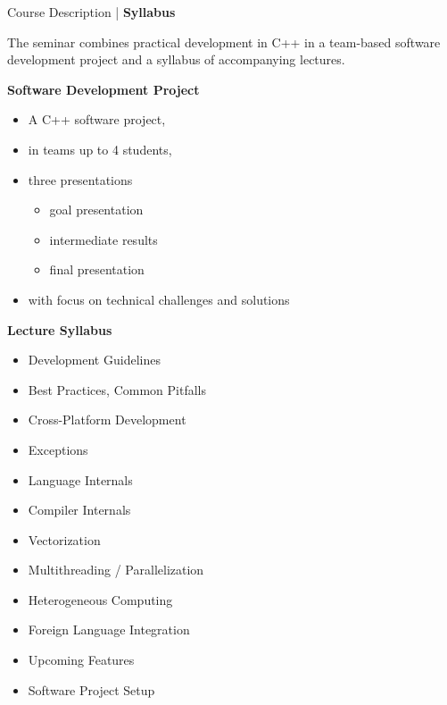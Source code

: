 \begin{frame}{Course Description | \textbf{Syllabus}}
    
    {
    	The seminar combines practical development in C++ in a team-based software development project and a syllabus of accompanying lectures.
    	
    	\bigskip
    	\bigskip
    	
    	\textbf{Software Development Project}
    	
    	\begin{itemize}
    		\item A C++ software project,
    		\item in teams up to 4 students,
    		\item three presentations
	    		\begin{itemize}
	    			\item goal presentation
			    	\item intermediate results
			    	\item final presentation
	    		\end{itemize}
    		\item with focus on technical challenges and solutions
    	\end{itemize}
    }
    {
    	\textbf{Lecture Syllabus}
    	
        \begin{itemize}
            \item Development Guidelines
            \item Best Practices, Common Pitfalls
            \item Cross-Platform Development
            \item Exceptions
            \item Language Internals
            \item Compiler Internals
            \item Vectorization
            \item Multithreading / Parallelization
            \item Heterogeneous Computing
	        \item Foreign Language Integration
	        \item Upcoming Features
	        \item Software Project Setup
        \end{itemize}
    }

\end{frame}


